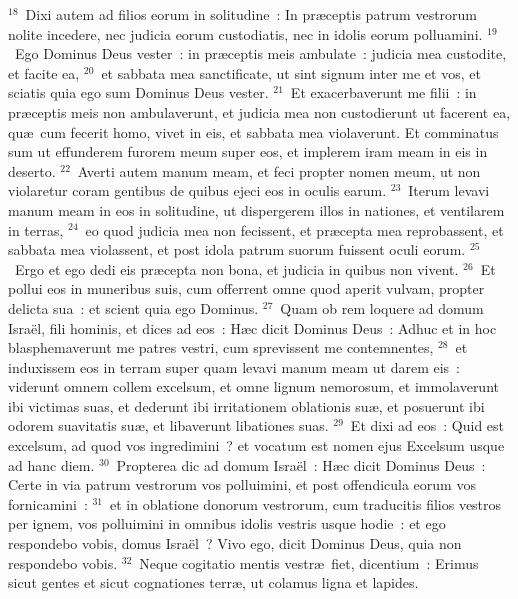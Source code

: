 ${}^{18}$~Dixi autem ad filios eorum in solitudine~: In pr\ae ceptis patrum vestrorum nolite incedere, nec judicia eorum custodiatis, nec in idolis eorum polluamini.
${}^{19}$~Ego Dominus Deus vester~: in pr\ae ceptis meis ambulate~: judicia mea custodite, et facite ea,
${}^{20}$~et sabbata mea sanctificate, ut sint signum inter me et vos, et sciatis quia ego sum Dominus Deus vester.
${}^{21}$~Et exacerbaverunt me filii~: in pr\ae ceptis meis non ambulaverunt, et judicia mea non custodierunt ut facerent ea, qu\ae\ cum fecerit homo, vivet in eis, et sabbata mea violaverunt. Et comminatus sum ut effunderem furorem meum super eos, et implerem iram meam in eis in deserto.
${}^{22}$~Averti autem manum meam, et feci propter nomen meum, ut non violaretur coram gentibus de quibus ejeci eos in oculis earum.
${}^{23}$~Iterum levavi manum meam in eos in solitudine, ut dispergerem illos in nationes, et ventilarem in terras,
${}^{24}$~eo quod judicia mea non fecissent, et pr\ae cepta mea reprobassent, et sabbata mea violassent, et post idola patrum suorum fuissent oculi eorum.
${}^{25}$~Ergo et ego dedi eis pr\ae cepta non bona, et judicia in quibus non vivent.
${}^{26}$~Et pollui eos in muneribus suis, cum offerrent omne quod aperit vulvam, propter delicta sua~: et scient quia ego Dominus.
${}^{27}$~Quam ob rem loquere ad domum Isra\"el, fili hominis, et dices ad eos~: H\ae c dicit Dominus Deus~: Adhuc et in hoc blasphemaverunt me patres vestri, cum sprevissent me contemnentes,
${}^{28}$~et induxissem eos in terram super quam levavi manum meam ut darem eis~: viderunt omnem collem excelsum, et omne lignum nemorosum, et immolaverunt ibi victimas suas, et dederunt ibi irritationem oblationis su\ae , et posuerunt ibi odorem suavitatis su\ae , et libaverunt libationes suas.
${}^{29}$~Et dixi ad eos~: Quid est excelsum, ad quod vos ingredimini~? et vocatum est nomen ejus Excelsum usque ad hanc diem.
${}^{30}$~Propterea dic ad domum Isra\"el~: H\ae c dicit Dominus Deus~: Certe in via patrum vestrorum vos polluimini, et post offendicula eorum vos fornicamini~:
${}^{31}$~et in oblatione donorum vestrorum, cum traducitis filios vestros per ignem, vos polluimini in omnibus idolis vestris usque hodie~: et ego respondebo vobis, domus Isra\"el~? Vivo ego, dicit Dominus Deus, quia non respondebo vobis.
${}^{32}$~Neque cogitatio mentis vestr\ae\ fiet, dicentium~: Erimus sicut gentes et sicut cognationes terr\ae , ut colamus ligna et lapides.


